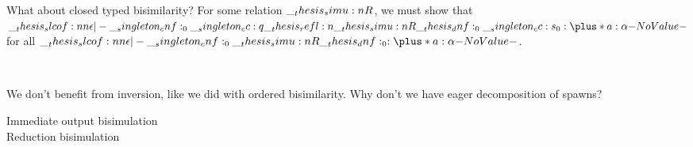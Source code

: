 What about closed typed bisimilarity?
For some relation $\__thesis_simu:n {R}$, we must show that $\slcof{\epsilon |- \cnf_0 \cc q \refl{\simu{R}} \dnf_0 \cc s_0 : \plus*{a:\alpha}}$ for all $\slcof{\epsilon |- \cnf_0 \simu{R} \dnf_0 : \plus*{a:\alpha}}$.
\begin{inferences}
  \\
\end{inferences}
We don't benefit from inversion, like we did with ordered bisimilarity.
Why don't we have eager decomposition of spawns?

\begin{description}
\item[Immediate output bisimulation]
\item[Reduction bisimulation]
  
\end{description}

